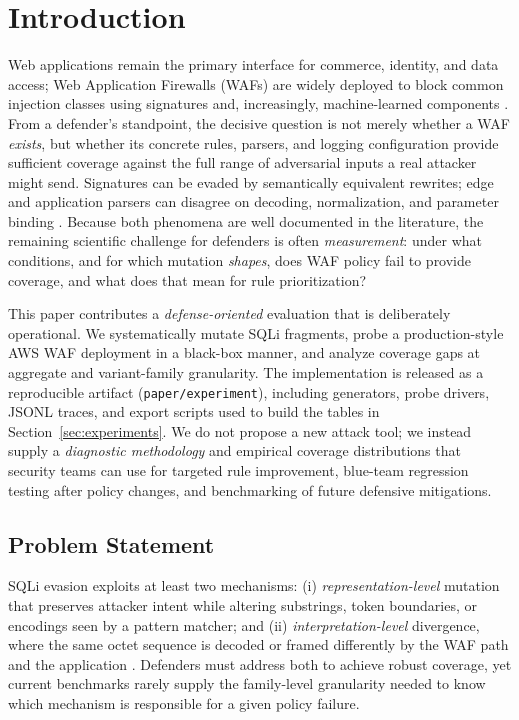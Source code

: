 \section{Introduction}
Web applications remain the primary interface for commerce, identity, and data access; Web Application Firewalls (WAFs) are widely deployed to block common injection classes using signatures and, increasingly, machine-learned components \cite{owasp-crs,waf-survey}. From a defender's standpoint, the decisive question is not merely whether a WAF \emph{exists}, but whether its concrete rules, parsers, and logging configuration provide sufficient coverage against the full range of adversarial inputs a real attacker might send. Signatures can be evaded by semantically equivalent rewrites; edge and application parsers can disagree on decoding, normalization, and parameter binding \cite{mutation-sqli-evasion,parsing-discrepancies,request-smuggling}. Because both phenomena are well documented in the literature, the remaining scientific challenge for defenders is often \emph{measurement}: under what conditions, and for which mutation \emph{shapes}, does WAF policy fail to provide coverage, and what does that mean for rule prioritization?

This paper contributes a \emph{defense-oriented} evaluation that is deliberately operational. We systematically mutate SQLi fragments, probe a production-style AWS WAF deployment in a black-box manner, and analyze coverage gaps at aggregate and variant-family granularity. The implementation is released as a reproducible artifact (\texttt{paper/experiment}), including generators, probe drivers, JSONL traces, and export scripts used to build the tables in Section~\ref{sec:experiments}. We do not propose a new attack tool; we instead supply a \emph{diagnostic methodology} and empirical coverage distributions that security teams can use for targeted rule improvement, blue-team regression testing after policy changes, and benchmarking of future defensive mitigations.

\subsection{Problem Statement}
SQLi evasion exploits at least two mechanisms: (i) \emph{representation-level} mutation that preserves attacker intent while altering substrings, token boundaries, or encodings seen by a pattern matcher; and (ii) \emph{interpretation-level} divergence, where the same octet sequence is decoded or framed differently by the WAF path and the application \cite{akhavani2025waffled}. Defenders must address both to achieve robust coverage, yet current benchmarks rarely supply the family-level granularity needed to know which mechanism is responsible for a given policy failure.

